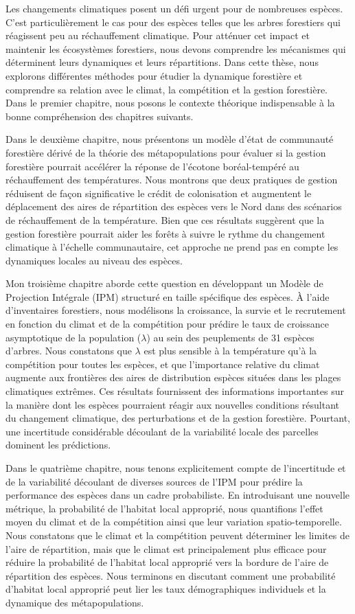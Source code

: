Les changements climatiques posent un défi urgent pour de nombreuses espèces. C'est particulièrement le cas pour des espèces telles que les arbres forestiers qui réagissent peu au réchauffement climatique. Pour atténuer cet impact et maintenir les écosystèmes forestiers, nous devons comprendre les mécanismes qui déterminent leurs dynamiques et leurs répartitions. Dans cette thèse, nous explorons différentes méthodes pour étudier la dynamique forestière et comprendre sa relation avec le climat, la compétition et la gestion forestière. 
Dans le premier chapitre, nous posons le contexte théorique indispensable à la bonne compréhension des chapitres suivants.

Dans le deuxième chapitre, nous présentons un modèle d'état de communauté forestière dérivé de la théorie des métapopulations pour évaluer si la gestion forestière pourrait accélérer la réponse de l'écotone boréal-tempéré au réchauffement des températures. Nous montrons que deux pratiques de gestion réduisent de façon significative le crédit de colonisation et augmentent le déplacement des aires de répartition des espèces vers le Nord dans des scénarios de réchauffement de la température. Bien que ces résultats suggèrent que la gestion forestière pourrait aider les forêts à suivre le rythme du changement climatique à l'échelle communautaire, cet approche ne prend pas en compte les dynamiques locales au niveau des espèces.

Mon troisième chapitre aborde cette question en développant un Modèle de Projection Intégrale (IPM) structuré en taille spécifique des espèces. À l'aide d'inventaires forestiers, nous modélisons la croissance, la survie et le recrutement en fonction du climat et de la compétition pour prédire le taux de croissance asymptotique de la population ($\lambda$) au sein des peuplements de 31 espèces d'arbres. Nous constatons que $\lambda$ est plus sensible à la température qu'à la compétition pour toutes les espèces, et que l'importance relative du climat augmente aux frontières des aires de distribution espèces situées dans les plages climatiques extrêmes. Ces résultats fournissent des informations importantes sur la manière dont les espèces pourraient réagir aux nouvelles conditions résultant du changement climatique, des perturbations et de la gestion forestière. Pourtant, une incertitude considérable découlant de la variabilité locale des parcelles dominent les prédictions.

Dans le quatrième chapitre, nous tenons explicitement compte de l'incertitude et de la variabilité découlant de diverses sources de l'IPM pour prédire la performance des espèces dans un cadre probabiliste. En introduisant une nouvelle métrique, la probabilité de l'habitat local approprié, nous quantifions l'effet moyen du climat et de la compétition ainsi que leur variation spatio-temporelle. Nous constatons que le climat et la compétition peuvent déterminer les limites de l'aire de répartition, mais que le climat est principalement plus efficace pour réduire la probabilité de l'habitat local approprié vers la bordure de l'aire de répartition des espèces. Nous terminons en discutant comment une probabilité d'habitat local approprié peut lier les taux démographiques individuels et la dynamique des métapopulations.

